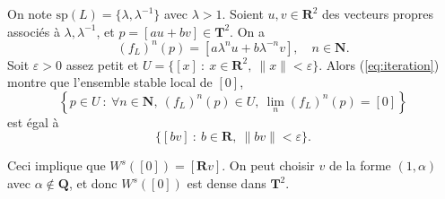 \documentclass[a4paper,12pt,openany]{article}
\theoremstyle{plain}
\theoremstyle{definition}
\newcommand{\T}{\mathbf{T}}
\newcommand{\R}{\mathbf{R}}
\newcommand{\Q}{\mathbf{Q}}
\newcommand{\N}{\mathbf{N}}
\begin{document}
\noindent On note $\mathrm{sp}(L) = \{\lambda, \lambda^{-1}\}$ avec $\lambda > 1$. Soient $u,v \in \R^2$ des vecteurs propres associ\'es \`a $\lambda, \lambda^{-1}$, et $p = [au + bv] \in \T^2$. On a 
\begin{equation}\label{eq:iteration}
(f_L)^n(p) = [a \lambda^n u + b \lambda^{-n} v], \quad n \in \N.
\end{equation}
Soit $\varepsilon > 0$ assez petit et $U = \{[x]~:~x \in \R^2,~\|x\| < \varepsilon\}$. Alors (\ref{eq:iteration}) montre que l'ensemble stable local de $[0]$,
$$
\left\{p \in U~:~\forall n \in \N,~(f_L)^n(p) \in U,~\lim_n (f_L)^n(p) = [0]\right\}
$$
est \'egal \`a
$$
\{[b v]~:~b\in \R,~\|bv\| < \varepsilon\}.
$$

\noindent Ceci implique que $W^s([0]) = [\R v]$. On peut choisir $v$ de la forme $(1, \alpha)$ avec $\alpha \notin \Q$, et donc $W^s([0])$ est dense dans $\T^2$.

\vspace{0.6cm}

 \vspace{1.5mm} 
\end{document}
